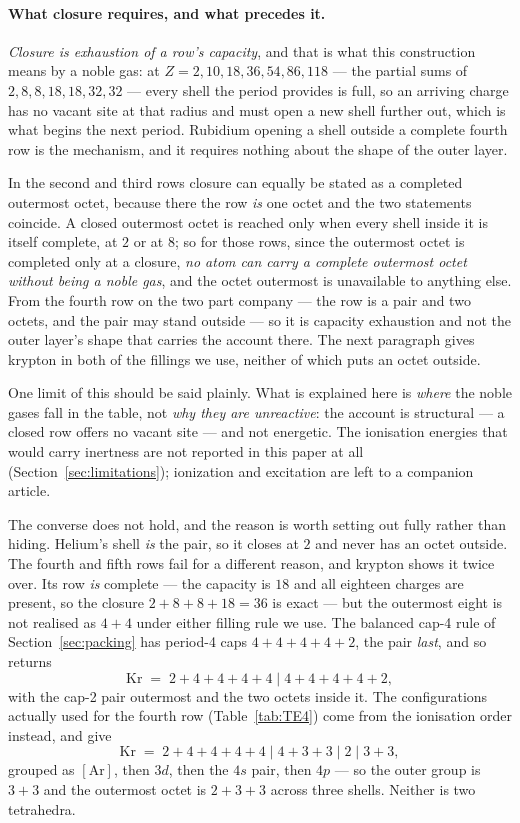 \documentclass[11pt]{article}
\begin{document}
\paragraph{What closure requires, and what precedes it.} \emph{Closure is exhaustion of a row's
capacity}, and that is what this construction means by a noble gas: at $Z=2,10,18,36,54,86,118$ ---
the partial sums of $2,8,8,18,18,32,32$ --- every shell the period provides is full, so an arriving
charge has no vacant site at that radius and must open a new shell further out, which is what begins
the next period. Rubidium opening a shell outside a complete fourth row is the mechanism, and it
requires nothing about the shape of the outer layer.

In the second and third rows closure can equally be stated as a completed outermost octet, because
there the row \emph{is} one octet and the two statements coincide. A closed outermost octet is
reached only when every shell inside it is itself complete, at $2$ or at $8$; so for those rows, since
the outermost octet is completed only at a closure, \emph{no atom can carry a complete outermost
octet without being a noble gas}, and the octet outermost is unavailable to anything else. From the
fourth row on the two part company --- the row is a pair and two octets, and the pair may stand
outside --- so it is capacity exhaustion and not the outer layer's shape that carries the account
there. The next paragraph gives krypton in both of the fillings we use, neither of which puts an
octet outside.

One limit of this should be said plainly. What is explained here is \emph{where} the noble gases
fall in the table, not \emph{why they are unreactive}: the account is structural --- a closed row
offers no vacant site --- and not energetic. The ionisation energies that would carry inertness are
not reported in this paper at all (Section~\ref{sec:limitations}); ionization and excitation are
left to a companion article.

The converse does not hold, and the reason is worth setting out fully rather than hiding. Helium's
shell \emph{is} the pair, so it closes at $2$ and never has an octet outside. The fourth and fifth
rows fail for a different reason, and krypton shows it twice over. Its row \emph{is} complete --- the
capacity is $18$ and all eighteen charges are present, so the closure $2{+}8{+}8{+}18=36$ is exact
--- but the outermost eight is not realised as $4{+}4$ under either filling rule we use. The balanced
cap-4 rule of Section~\ref{sec:packing} has period-4 caps $4{+}4{+}4{+}4{+}2$, the pair \emph{last},
and so returns
\[
\mathrm{Kr} \;=\; 2{+}4{+}4{+}4{+}4\;|\;4{+}4{+}4{+}4{+}2 ,
\]
with the cap-2 pair outermost and the two octets inside it. The configurations actually used for the
fourth row (Table~\ref{tab:TE4}) come from the ionisation order instead, and give
\[
\mathrm{Kr} \;=\; 2{+}4{+}4{+}4{+}4\;|\;4{+}3{+}3\;|\;2\;|\;3{+}3 ,
\]
grouped as $[\mathrm{Ar}]$, then $3d$, then the $4s$ pair, then $4p$ --- so the outer group is
$3{+}3$ and the outermost octet is $2{+}3{+}3$ across three shells. Neither is two tetrahedra.
\end{document}
